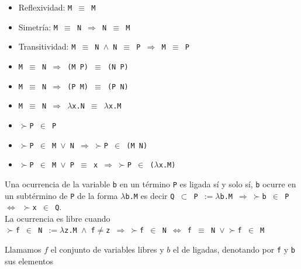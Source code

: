 \begin{defn}
\end{defn}
\begin{itemize}
\item Reflexividad: \texttt{M $\equiv$ M}
\item Simetría: \texttt{M $\equiv$ N $\Rightarrow$ N $\equiv$ M}
\item Transitividad: \texttt{M $\equiv$ N $\wedge$ N $\equiv$ P $\Rightarrow$  M $\equiv$ P}
\item \texttt{M $\equiv$ N $\Rightarrow$ (M P) $\equiv$ (N P)}
\item \texttt{M $\equiv$ N $\Rightarrow$ (P M) $\equiv$ (P N)}
\item \texttt{M $\equiv$ N $\Rightarrow$ $\lambda$x.N $\equiv$ $\lambda$x.M}
\end{itemize}

\begin{defn}\end{defn}
\begin{itemize}
\item \texttt{$\succ$P $\in$ P}
\item \texttt{$\succ$P $\in$ M $\vee$ N $\Rightarrow \ \succ$P $\in$ (M N)}
\item \texttt{$\succ$P $\in$ M $\vee$ P $\equiv$ x $\Rightarrow \ \succ$P $\in$ ($\lambda$x.M)}
\end{itemize}

\begin{defn}\end{defn}
Una ocurrencia de la variable \texttt{b} en un término \texttt{P} es ligada sí y solo sí, \texttt{b} ocurre en un subtérmino de \texttt{P} de la forma \texttt{$\lambda$b.M} es decir 
\texttt{Q $\subset $ P $ := \lambda$b.M
$\Rightarrow \ \succ$b $\in$ P $\Leftrightarrow$ 
$\succ$x $\in$ Q}. \\
La ocurrencia es libre cuando \\
\texttt{$\succ$f $\in$ N $ := \lambda$z.M $\wedge$
f$\neq$z 
$\Rightarrow \ \succ$f $\in$ N $\Leftrightarrow  
$ f $\equiv$ N $\vee \ \succ$f $\in$ M }

\begin{note}
Llamamos $\mathit{f}$ el conjunto de variables libres
y $\mathit{b}$ el de ligadas, denotando por \texttt{f} y \texttt{b} sus elementos
\end{note}


